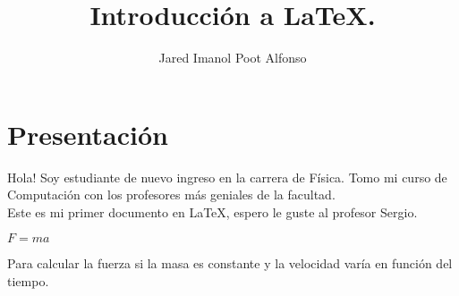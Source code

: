 \documentclass[a4paper,10pt]{article}
\title{Introducción a \LaTeX.}
\author{Jared Imanol Poot Alfonso}
\begin{document}
\maketitle

% 

\section{Presentación}

Hola! Soy estudiante de nuevo ingreso en la carrera de Física. Tomo mi curso de Computación con los profesores más geniales de la facultad. \\ 

Este es mi primer documento en \LaTeX, espero le guste al profesor Sergio.\\ 
\begin{center}

$ F= ma$\\  
\end{center}


Para calcular la fuerza si la masa es constante y la velocidad varía en función del tiempo.\\
\end{document}
